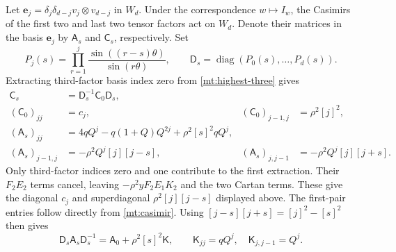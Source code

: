 \documentclass[11pt]{article}
\numberwithin{equation}{section}
\theoremstyle{definition}\newtheorem{definition}[theorem]{Definition}
\theoremstyle{remark}\newtheorem{remark}[theorem]{Remark}
\newcommand{\diag}{\operatorname{diag}}
\begin{document}
Let $\mathbf e_j=\delta_j\delta_{d-j}v_j\otimes v_{d-j}$ in
$W_d$. Under the correspondence $w\mapsto I_w$, the Casimirs of the first
two and last two tensor factors act on $W_d$. Denote their matrices
in the basis $\mathbf e_j$ by $\mathsf A_s$ and $\mathsf C_s$,
respectively. Set
\[
 P_j(s)=\prod_{r=1}^j\frac{\sin((r-s)\theta)}{\sin(r\theta)},
 \qquad \mathsf D_s=\diag(P_0(s),\ldots,P_d(s)).
\]
Extracting third-factor basis index zero from \eqref{mt:highest-three} gives
\begin{equation}\label{mt:two-matrices}
\begin{aligned}
 \mathsf C_s&=\mathsf D_s^{-1}\mathsf C_0\mathsf D_s,\\
 (\mathsf C_0)_{jj}&=c_j,& (\mathsf C_0)_{j-1,j}&=\rho^2[j]^2,\\
 (\mathsf A_s)_{jj}&=4qQ^j-q(1+Q)Q^{2j}+\rho^2[s]^2qQ^j,\\
 (\mathsf A_s)_{j-1,j}&=-\rho^2Q^j[j][j-s],&
 (\mathsf A_s)_{j,j-1}&=-\rho^2Q^j[j][j+s].
\end{aligned}
\end{equation}
Only third-factor indices zero and one contribute to the first extraction.
Their $F_2E_2$ terms cancel, leaving
$-\rho^2yF_2E_1K_2$ and the two Cartan terms. These give the
diagonal $c_j$ and superdiagonal $\rho^2[j][j-s]$ displayed above.
The first-pair entries follow directly from \eqref{mt:casimir}.
Using $[j-s][j+s]=[j]^2-[s]^2$ then gives
\begin{equation}\label{mt:perturbation}
 \mathsf D_s\mathsf A_s\mathsf D_s^{-1}
       =\mathsf A_0+\rho^2[s]^2\mathsf K,\qquad
 \mathsf K_{jj}=qQ^j,\quad \mathsf K_{j,j-1}=Q^j.
\end{equation}
\end{document}
